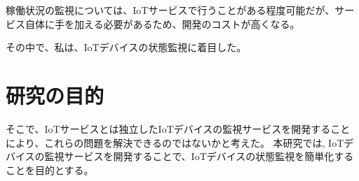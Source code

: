 稼働状況の監視については、IoTサービスで行うことがある程度可能だが、サービス自体に手を加える必要があるため、開発のコストが高くなる。

その中で、私は、IoTデバイスの状態監視に着目した。

\section{研究の目的}
そこで、IoTサービスとは独立したIoTデバイスの監視サービスを開発することにより、これらの問題を解決できるのではないかと考えた。
本研究では, IoTデバイスの監視サービスを開発することで、IoTデバイスの状態監視を簡単化することを目的とする。

